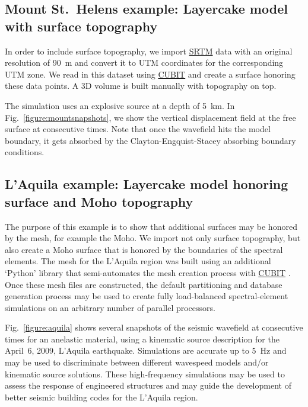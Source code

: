 \documentclass[referee,extra]{gji}
\begin{document}
\subsection{Mount St.~Helens example: Layercake model with surface topography}\label{subsec:examplemount}

In order to include surface topography,
we import \href{http://srtm.csi.cgiar.org/}{SRTM} data
with an original resolution of 90~m \citep{JaReNeGue2008}
and convert it to UTM coordinates for the corresponding UTM zone.
We read in this dataset using \href{http://cubit.sandia.gov}{CUBIT} and create a surface honoring these data points.
A 3D volume is built manually with topography on top.

The simulation uses an explosive source at a depth of 5~km.
In Fig.~\ref{figure:mountsnapshots},
we show the vertical displacement field at the free surface at consecutive times.
Note that once the wavefield hits the model boundary, it gets absorbed by the Clayton-Engquist-Stacey absorbing boundary conditions.


\subsection{L'Aquila example: Layercake model honoring surface and Moho topography}\label{subsec:exampleaquila}

The purpose of this example is to show that additional surfaces may be honored by the mesh,
for example the Moho.
We import not only surface topography,
but also create a Moho surface that is honored by the boundaries of the spectral elements.
The mesh for the L'Aquila region was built using an additional `Python' library that semi-automates the mesh creation process with \href{http://cubit.sandia.gov}{CUBIT} \citep{CaStLeKoPiTr08}.
Once these mesh files are constructed,
the default partitioning and database generation process may be used to create fully load-balanced
spectral-element simulations on an arbitrary number of parallel processors.

Fig.~\ref{figure:aquila} shows several snapshots of the
seismic wavefield at consecutive times for an anelastic material,
using a kinematic source description for the April~6, 2009, L'Aquila earthquake.
Simulations are accurate up to 5~Hz
and may be used to discriminate between different wavespeed models and/or kinematic source solutions.
These high-frequency simulations may be used to assess the response of engineered structures and may guide
the development of better seismic building codes for the L'Aquila region.
\end{document}
